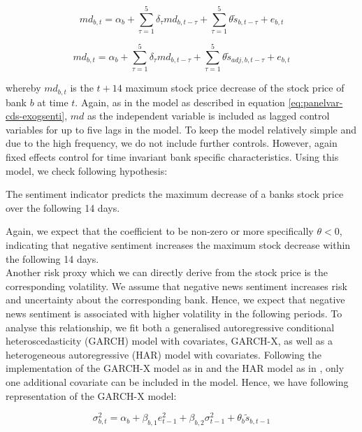 \begin{equation} \label{eq:mdd}
	md_{b,t} = \alpha_b + \sum_{\tau=1}^5\delta_\tau md_{b,t-\tau} + \sum_{\tau=1}^5 \theta \tilde{s}_{b,t-\tau} + e_{b,t}
\end{equation}

\begin{equation} \label{eq:mdd}
	md_{b,t} = \alpha_b + \sum_{\tau=1}^5\delta_\tau md_{b,t-\tau} + \sum_{\tau=1}^5 \theta \tilde{s}_{adj,b,t-\tau} + e_{b,t}
\end{equation}

whereby $md_{b,t}$ is the $t+14$ maximum stock price decrease of the stock price of bank $b$ at time $t$. Again, as in the model as described in equation \ref{eq:panelvar-cds-exogsenti}, $md$ as the independent variable is included as lagged control variables for up to five lags in the model. To keep the model relatively simple and due to the high frequency, we do not include further controls. However, again fixed effects control for time invariant bank specific characteristics. Using this model, we check following hypothesis:

\begin{hyp}
	The sentiment indicator predicts the maximum decrease of a banks stock price over the following 14 days.
\end{hyp}

Again, we expect that the coefficient to be non-zero or more specifically $\theta<0$, indicating that negative sentiment increases the maximum stock decrease within the following 14 days. \\

Another risk proxy which we can directly derive from the stock price is the corresponding volatility. We assume that negative news sentiment increases risk and uncertainty about the corresponding bank. Hence, we expect that negative news sentiment is associated with higher volatility in the following periods. To analyse this relationship, we fit both a generalised autoregressive conditional heteroscedasticity (GARCH) model with covariates, GARCH-X, as well as a heterogeneous autoregressive (HAR) model with covariates. Following the implementation of the GARCH-X model as in \cite{sucarrat2021} and the HAR model as in \cite{boudt2022}, only one additional covariate can be included in the model. Hence, we have following representation of the GARCH-X model: 

\begin{equation}
	\sigma^2_{b,t} = \alpha_b + \beta_{b,1}e^2_{t-1} + \beta_{b,2}\sigma^2_{t-1} + \theta_b\tilde{s}_{b,t-1}
\end{equation}

